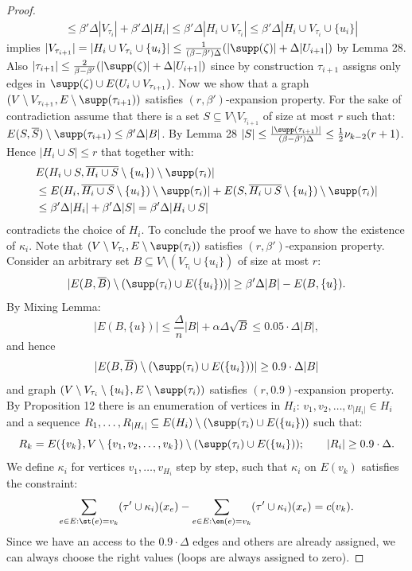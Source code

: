 \begin{proof}
\begin{align*}
&\le\beta'\Delta|V_{\tau_i}|+\beta'\Delta|H_i|\le\beta'\Delta|H_i\cup V_{\tau_i}|\le\beta'\Delta|H_i\cup V_{\tau_i}\cup\{u_i\}|
\end{align*}
implies $|V_{\tau_{i+1}}|=|H_i\cup V_{\tau_i}\cup\{u_i\}|\le\frac{1}{(\beta-\beta')\Delta}(|\supp(\zeta)|+\Delta|U_{i+1}|)$ by Lemma 28. Also $|\tau_{i+1}|\le\frac{2}{\beta-\beta'}(|\supp(\zeta)|+\Delta|U_{i+1}|)$ since by construction $\tau_{i+1}$ assigns only edges in $\supp(\zeta)\cup E(U_i\cup V_{\tau_{i+1}})$.
Now we show that a graph $(V\setminus V_{\tau_{i+1}},E\setminus\supp(\tau_{i+1}))$ satisfies $(r,\beta')$-expansion property. For the sake of contradiction assume that there is a set $S\subseteq V\setminus V_{\tau_{i+1}}$ of size at most $r$ such that: $E(S,\overline S)\setminus\supp(\tau_{i+1})\le\beta'\Delta|B|$.
By Lemma 28 $|S|\le\frac{|\supp(\tau_{i+1})|}{(\beta-\beta')\Delta}\le\tfrac12\nu_{k-2}(r+1)$. Hence $|H_i\cup S|\le r$ that together with:
\begin{align*}
&E(H_i\cup S,\overline{H_i\cup S}\setminus\{u_i\})\setminus\supp(\tau_i)|\\
&\le E(H_i,\overline{H_i\cup S}\setminus\{u_i\})\setminus\supp(\tau_i)|+E(S,\overline{H_i\cup S}\setminus\{u_i\})\setminus\supp(\tau_i)|\\
&\le\beta'\Delta|H_i|+\beta'\Delta|S|=\beta'\Delta|H_i\cup S|
\end{align*}
contradicts the choice of $H_i$.
To conclude the proof we have to show the existence of $\kappa_i$. Note that $(V\setminus V_{\tau_i},E\setminus\supp(\tau_i))$ satisfies $(r,\beta')$-expansion property. Consider an arbitrary set $B\subseteq V\setminus(V_{\tau_i}\cup\{u_i\})$ of size at most $r$:
\[|E(B,\overline B)\setminus(\supp(\tau_i)\cup E(\{u_i\}))|\ge\beta'\Delta|B|-E(B,\{u\}).\]
By Mixing Lemma:
\[|E(B,\{u\})|\le\frac\Delta n|B|+\alpha\Delta\sqrt B\le0.05\cdot\Delta|B|,\]
and hence
\[|E(B,\overline B)\setminus(\supp(\tau_i)\cup E(\{u_i\}))|\ge0.9\cdot\Delta|B|\]
and graph $(V\setminus V_{\tau_i}\setminus\{u_i\},E\setminus\supp(\tau_i))$ satisfies $(r,0.9)$-expansion property.
By Proposition 12 there is an enumeration of vertices in $H_i$: $v_1,v_2,\ldots,v_{|H_i|}\in H_i$ and a sequence $R_1,\ldots,R_{|H_i|}\subseteq E(H_i)\setminus(\supp(\tau_i)\cup E(\{u_i\}))$ such that:
\[R_k=E(\{v_k\},V\setminus\{v_1,v_2,\ldots,v_k\})\setminus(\supp(\tau_i)\cup E(\{u_i\}));\qquad |R_i|\ge0.9\cdot\Delta.\]
We define $\kappa_i$ for vertices $v_1,\ldots,v_{H_i}$ step by step, such that $\kappa_i$ on $E(v_k)$ satisfies the constraint:
\[\sum_{e\in E:\st(e)=v_k}(\tau'\cup\kappa_i)(x_e)-\sum_{e\in E:\en(e)=v_k}(\tau'\cup\kappa_i)(x_e)=c(v_k).\]
Since we have an access to the $0.9\cdot\Delta$ edges and others are already assigned, we can always choose the right values (loops are always assigned to zero).
\end{proof}
